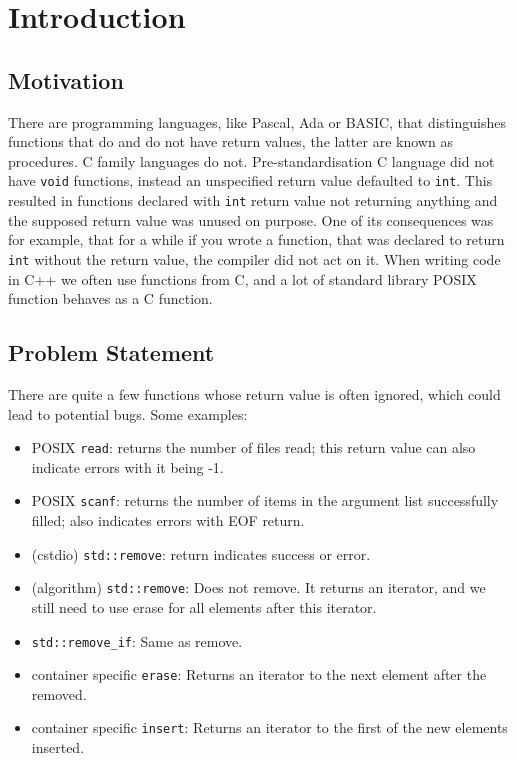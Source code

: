 \chapter{Introduction}
\label{ch:intro}

\section{Motivation}

There are programming languages, like Pascal, Ada or BASIC, that distinguishes functions that do and do not have return values,
the latter are known as procedures. C family languages do not. Pre-standardisation C language did not have \lstinline{void} functions,
instead an unspecified return value defaulted to \lstinline{int}. This resulted in functions declared with \lstinline{int} return value
not returning anything and the supposed return value was unused on purpose. One of its consequences was for example, that for a while if
you wrote a function, that was declared to return \lstinline{int} without the return value, the compiler did not act on it. When writing
code in C++ we often use functions from C, and a lot of standard library POSIX function behaves as a C function.

\section{Problem Statement}

There are quite a few functions whose return value is often ignored, which could lead to potential bugs. Some examples:

\begin{itemize}
	\item POSIX \texttt{read}: returns the number of files read; this return value can also indicate errors with it being -1.
	\item POSIX \texttt{scanf}: returns the number of items in the argument list successfully filled; also indicates errors with EOF return.
	\item (cstdio) \texttt{std::remove}: return indicates success or error.
	\item (algorithm) \texttt{std::remove}: Does not remove. It returns an iterator, and we still need to use erase for all elements after this iterator.
	\item \texttt{std::remove\_if}: Same as remove.
	\item container specific \texttt{erase}: Returns an iterator to the next element after the removed. 
	\item container specific \texttt{insert}: Returns an iterator to the first of the new elements inserted.
\end{itemize}

